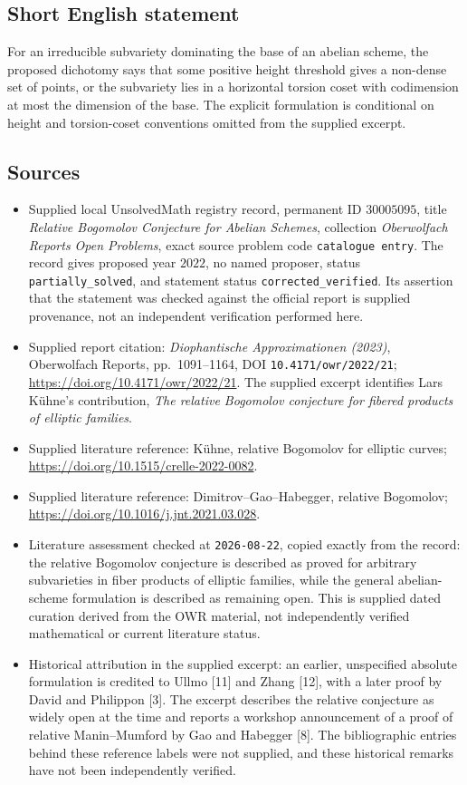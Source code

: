 \documentclass[11pt]{article}
\begin{document}
\subsection{Short English statement}
For an irreducible subvariety dominating the base of an abelian scheme, the proposed dichotomy says that some positive height threshold gives a non-dense set of points, or the subvariety lies in a horizontal torsion coset with codimension at most the dimension of the base. The explicit formulation is conditional on height and torsion-coset conventions omitted from the supplied excerpt.
\subsection{Sources}
\begin{itemize}
\item Supplied local UnsolvedMath registry record, permanent ID \(30005095\), title \emph{Relative Bogomolov Conjecture for Abelian Schemes}, collection \emph{Oberwolfach Reports Open Problems}, exact source problem code \texttt{catalogue entry}. The record gives proposed year \(2022\), no named proposer, status \texttt{partially\_solved}, and statement status \texttt{corrected\_verified}. Its assertion that the statement was checked against the official report is supplied provenance, not an independent verification performed here.
\item Supplied report citation: \emph{Diophantische Approximationen (2023)}, Oberwolfach Reports, pp.\ 1091--1164, DOI \texttt{10.4171/owr/2022/21}; \url{https://doi.org/10.4171/owr/2022/21}. The supplied excerpt identifies Lars K\"uhne's contribution, \emph{The relative Bogomolov conjecture for fibered products of elliptic families}.
\item Supplied literature reference: K\"uhne, relative Bogomolov for elliptic curves; \url{https://doi.org/10.1515/crelle-2022-0082}.
\item Supplied literature reference: Dimitrov--Gao--Habegger, relative Bogomolov; \url{https://doi.org/10.1016/j.jnt.2021.03.028}.
\item Literature assessment checked at \texttt{2026-08-22}, copied exactly from the record: the relative Bogomolov conjecture is described as proved for arbitrary subvarieties in fiber products of elliptic families, while the general abelian-scheme formulation is described as remaining open. This is supplied dated curation derived from the OWR material, not independently verified mathematical or current literature status.
\item Historical attribution in the supplied excerpt: an earlier, unspecified absolute formulation is credited to Ullmo [11] and Zhang [12], with a later proof by David and Philippon [3]. The excerpt describes the relative conjecture as widely open at the time and reports a workshop announcement of a proof of relative Manin--Mumford by Gao and Habegger [8]. The bibliographic entries behind these reference labels were not supplied, and these historical remarks have not been independently verified.
\end{itemize}
\end{document}
